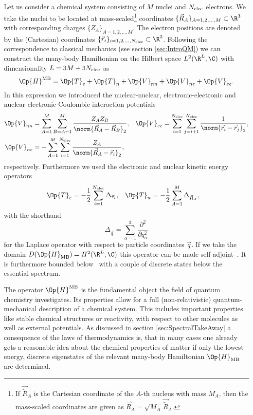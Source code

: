 Let us consider a chemical system consisting of $M$ nuclei and $N_\text{elec}$ electrons.
We take the nuclei to be located at mass-scaled\footnote{
	If $\vec{\tilde{R}}_A$ is the Cartesian coordinate
	of the $A$-th nucleus with mass $M_A$, then
	the mass-scaled coordinates are given as
	$\vec{R}_A = \sqrt{M_A} \, \vec{\tilde{R}}_A$.
} coordinates
$\{\vec{R}_A\}_{A = 1, 2, \ldots, M} \subset \R^3$
with corresponding charges
$\{Z_A\}_{A = 1, 2, \ldots, M}$.
The electron positions are denoted by the (Cartesian) coordinates
$\{\vec{r}_i\}_{i = 1, 2, \ldots, \Nelec} \subset \R^3$.
Following the correspondence to classical mechanics (see section \vref{sec:IntroQM})
we can construct the many-body Hamiltonian
on the Hilbert space $L^2(\R^L, \C)$ with dimensionality $L = 3M+3N_\text{elec}$ as
\begin{equation}
	\Op{H}^\text{MB} = \Op{T}_e + \Op{T}_n + \Op{V}_{nn} + \Op{V}_{ne} + \Op{V}_{ee}.
	\label{eqn:ManyBodyHamiltonian}
\end{equation}
In this expression we introduced the
nuclear-nuclear, electronic-electronic and nuclear-electronic
Coulombic interaction potentials
\begin{align}
	\label{eqn:ManyBodyHamiltonianPotential}
	\Op{V}_{nn} &= \sum_{A=1}^M \sum_{B=A+1}^M
		\frac{Z_A Z_B}{\norm{\vec{R}_A - \vec{R}_B}_2}, &
	\Op{V}_{ee} &= \sum_{i=1}^{\Nelec} \sum_{j=i+1}^{\Nelec}
		\frac{1}{\norm{\vec{r}_i - \vec{r}_j}_2}, \\
	\nonumber
	\Op{V}_{ne} &= - \sum_{A=1}^M \sum_{i=1}^{\Nelec} \frac{Z_A}{\norm{\vec{R}_A - \vec{r}_i}_2},
\end{align}
respectively.
Furthermore we used the electronic and nuclear kinetic energy operators
\begin{align}
	\label{eqn:ManyBodyHamiltonianKinetic}
	\Op{T}_e &= -\frac12 \sum_{i=1}^{\Nelec} \Delta_{\vec{r}_i}, &
	\Op{T}_n &= -\frac12 \sum_{A=1}^M \Delta_{\vec{R}_A},
\end{align}
with the shorthand
\[ \Delta_{\vec{q}} = \sum_{\alpha=1}^3 \frac{\partial^2}{\partial q_\alpha^2} \]
for the Laplace operator with respect to particle coordinates $\vec{q}$.
If we take the domain $D(\Op{H}_\text{MB}) = H^2(\R^L, \C)$
this operator can be made self-adjoint~\cite{Kato1951}.
It is furthermore bounded below~\cite{Kato1951}
with a couple of discrete states below the essential spectrum.

The operator $\Op{H}^\text{MB}$ is the fundamental object
the field of quantum chemistry investigates.
Its properties allow for a full
(non-relativistic) quantum-mechanical description
of a chemical system.
This includes important properties like stable chemical structures
or reactivity, with respect to other molecules as well as external potentials.
As discussed in section \vref{sec:SpectralTakeAway}
a consequence of the laws of thermodynamics is,
that in many cases one already gets
a reasonable idea about the chemical properties of matter
if only the lowest-energy, discrete eigenstates of the relevant
many-body Hamiltonian $\Op{H}_\text{MB}$ are determined.

